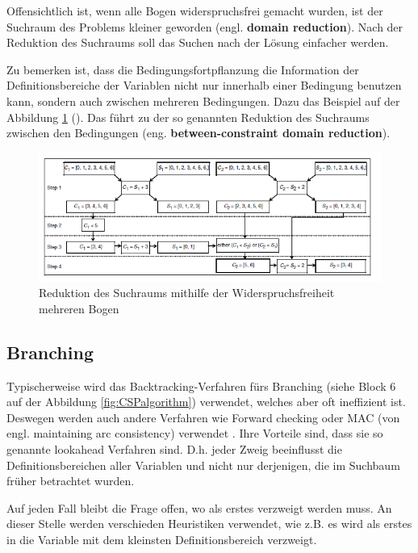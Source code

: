 \FloatBarrier

Offensichtlich ist, wenn alle Bogen widerspruchsfrei gemacht wurden, ist der Suchraum des Problems kleiner geworden (engl. {\bf domain reduction}). Nach der Reduktion des Suchraums soll das Suchen nach der Lösung einfacher werden.

Zu bemerken ist, dass die Bedingungsfortpflanzung die Information der Definitionsbereiche der Variablen nicht nur innerhalb einer Bedingung benutzen kann, sondern auch zwischen mehreren Bedingungen. Dazu das Beispiel auf der Abbildung \ref{fig:ConstraintPropagation2} (\cite{CPforScheduling}). Das führt zu der so genannten Reduktion des Suchraums zwischen den Bedingungen (eng. {\bf between-constraint domain reduction}).

\begin{figure}[h]
	\centering
	\includegraphics[scale=0.8]{fig/ConstraintPropagation2.png}
	\caption[Reduktion des Suchraums mithilfe der Widerspruchsfreiheit mehreren Bogen]{Reduktion des Suchraums mithilfe der Widerspruchsfreiheit mehreren Bogen \citep[aus][]{CPforScheduling}}
	\label{fig:ConstraintPropagation2}
\end{figure}

\subsection{Branching}

Typischerweise wird das Backtracking-Verfahren fürs Branching (siehe Block $6$ auf der Abbildung \ref{fig:CSPalgorithm}) verwendet, welches aber oft ineffizient ist. Deswegen werden auch andere Verfahren wie Forward checking oder MAC (von engl. maintaining arc consistency) verwendet \citep[vgl.][]{CSP}. Ihre Vorteile sind, dass sie so genannte lookahead Verfahren sind. D.h. jeder Zweig beeinflusst die Definitionsbereichen aller Variablen und nicht nur derjenigen, die im Suchbaum früher betrachtet wurden.

Auf jeden Fall bleibt die Frage offen, wo als erstes verzweigt werden muss. An dieser Stelle werden verschieden Heuristiken verwendet, wie z.B. es wird als erstes in die Variable mit dem kleinsten Definitionsbereich verzweigt.

